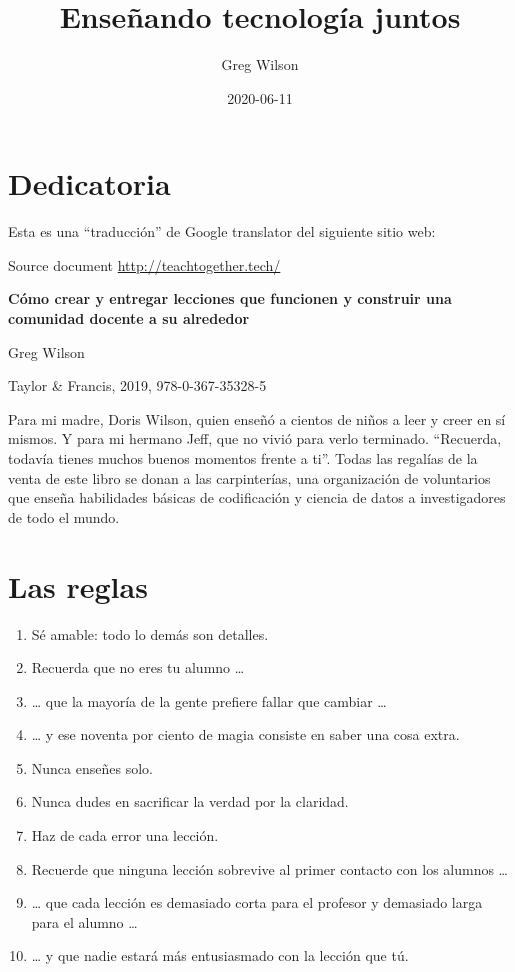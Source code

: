 \documentclass[
]{book}
\title{Enseñando tecnología juntos}
\author{Greg Wilson}
\date{2020-06-11}
\providecommand{\tightlist}{%
  \setlength{\itemsep}{0pt}\setlength{\parskip}{0pt}}
\begin{document}
\maketitle

{
\setcounter{tocdepth}{1}
\tableofcontents
}
\hypertarget{dedicatoria}{%
\chapter{Dedicatoria}\label{dedicatoria}}

Esta es una ``traducción'' de Google translator del siguiente sitio web:

Source document \url{http://teachtogether.tech/}

\textbf{Cómo crear y entregar lecciones que funcionen y construir una comunidad docente a su alrededor}

Greg Wilson

Taylor \& Francis, 2019, 978-0-367-35328-5

Para mi madre, Doris Wilson,
quien enseñó a cientos de niños a leer y creer en sí mismos.
Y para mi hermano Jeff, que no vivió para verlo terminado.
``Recuerda, todavía tienes muchos buenos momentos frente a ti''.
Todas las regalías de la venta de este libro se donan a
las carpinterías,
una organización de voluntarios que enseña
habilidades básicas de codificación y ciencia de datos
a investigadores de todo el mundo.

\hypertarget{las-reglas}{%
\chapter{Las reglas}\label{las-reglas}}

\begin{enumerate}
\def\labelenumi{\arabic{enumi}.}
\tightlist
\item
  Sé amable: todo lo demás son detalles.
\item
  Recuerda que no eres tu alumno \ldots{}
\item
  \ldots{} que la mayoría de la gente prefiere fallar que cambiar \ldots{}
\item
  \ldots{} y ese noventa por ciento de magia consiste en saber una cosa extra.
\item
  Nunca enseñes solo.
\item
  Nunca dudes en sacrificar la verdad por la claridad.
\item
  Haz de cada error una lección.
\item
  Recuerde que ninguna lección sobrevive al primer contacto con los alumnos \ldots{}
\item
  \ldots{} que cada lección es demasiado corta para el profesor y demasiado larga para el alumno \ldots{}
\item
  \ldots{} y que nadie estará más entusiasmado con la lección que tú.
\end{enumerate}
\end{document}
